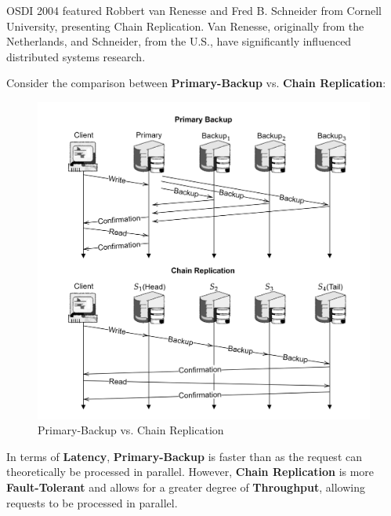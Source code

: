 \vspace{-1em}
\begin{Tip}  
    OSDI 2004 featured Robbert van Renesse and Fred B. Schneider from Cornell University, presenting Chain Replication. Van Renesse, originally from the Netherlands, and Schneider, from the U.S., have significantly influenced distributed systems research.  
    \end{Tip}
    
    
    
\noindent

Consider the comparison between \textbf{Primary-Backup} vs. \textbf{Chain Replication}:
\begin{figure}[h]
    \centering
    \includegraphics[width=1\textwidth]{Sections/rep/comp.png}
    \caption{Primary-Backup vs. Chain Replication}
\end{figure}

\begin{theo}

    In terms of \textbf{Latency}, \textbf{Primary-Backup} is faster than as the request can theoretically be processed in parallel. 
    However, \textbf{Chain Replication} is more \textbf{Fault-Tolerant} and allows for a greater degree of \textbf{Throughput}, allowing 
    requests to be processed in parallel.
\end{theo}


